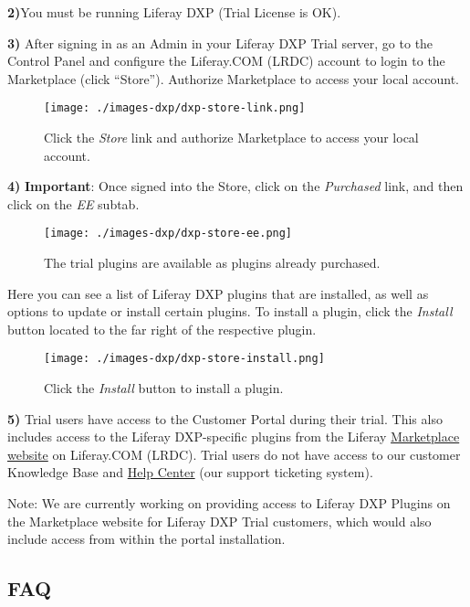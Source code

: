 \textbf{2)}You must be running Liferay DXP (Trial License is OK).

\textbf{3)} After signing in as an Admin in your Liferay DXP Trial
server, go to the Control Panel and configure the Liferay.COM (LRDC)
account to login to the Marketplace (click ``Store''). Authorize
Marketplace to access your local account.

\begin{figure}
\centering
\texttt{[image: ./images-dxp/dxp-store-link.png]}
\caption{Click the \emph{Store} link and authorize Marketplace to access
your local account.}
\end{figure}

\textbf{4)} \textbf{Important}: Once signed into the Store, click on the
\emph{Purchased} link, and then click on the \emph{EE} subtab.

\begin{figure}
\centering
\texttt{[image: ./images-dxp/dxp-store-ee.png]}
\caption{The trial plugins are available as plugins already purchased.}
\end{figure}

Here you can see a list of Liferay DXP plugins that are installed, as
well as options to update or install certain plugins. To install a
plugin, click the \emph{Install} button located to the far right of the
respective plugin.

\begin{figure}
\centering
\texttt{[image: ./images-dxp/dxp-store-install.png]}
\caption{Click the \emph{Install} button to install a plugin.}
\end{figure}

\textbf{5)} Trial users have access to the Customer Portal during their
trial. This also includes access to the Liferay DXP-specific plugins
from the Liferay \href{https://www.liferay.com/marketplace}{Marketplace
website} on Liferay.COM (LRDC). Trial users do not have access to our
customer Knowledge Base and \href{https://help.liferay.com/hc}{Help
Center} (our support ticketing system).

\noindent\hrulefill

Note: We are currently working on providing access to Liferay DXP
Plugins on the Marketplace website for Liferay DXP Trial customers,
which would also include access from within the portal installation.

\noindent\hrulefill

\subsection{FAQ}\label{faq}

